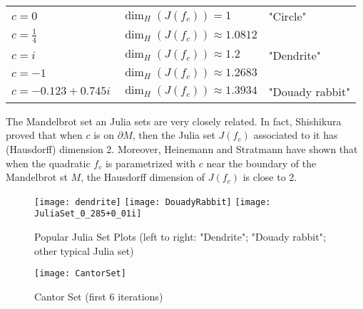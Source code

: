 \vspace{0.2cm}
\begin{tabular}{l l l}\label{table:JuliaSetDimensions}
	$c = 0$             & $\dim_H(J(f_c)) = 1$            & "Circle"\\
	$c = \frac{1}{4}$   & $\dim_H(J(f_c)) \approx 1.0812$ & \\
	$c = i$             & $\dim_H(J(f_c)) \approx 1.2$    & "Dendrite" \\
	$c = -1$            & $\dim_H(J(f_c)) \approx 1.2683$ & \\
	$c = -0.123+0.745i$ & $\dim_H(J(f_c)) \approx 1.3934$ & "Douady rabbit" \\
\end{tabular}
\vspace{0.3cm}

The Mandelbrot set an Julia sets are very closely related.
In fact, Shishikura proved \cite{Shishikura_1992} that when $c$ is on $\partial M$, then the Julia set $J(f_c)$ associated to it has (Hausdorff) dimension 2.
Moreover, Heinemann and Stratmann have shown \cite{Heinemann_Stratmann_1998} that when the quadratic $f_c$ is parametrized with $c$ near the boundary of the Mandelbrot st $M$, the Hausdorff dimension of $J(f_c)$ is close to 2.

\begin{figure}[h]
	\texttt{[image: dendrite]}
	\texttt{[image: DouadyRabbit]}
	\texttt{[image: JuliaSet\_0\_285+0\_01i]}
	\centering
	\captionsetup{justification=centering}
	\caption[Julia sets examples]{Popular Julia Set Plots \newline (left to right: "Dendrite"\footnotemark; "Douady rabbit"\footnotemark; other typical Julia set\footnotemark)}
	\label{fig:JuliaSet}
\end{figure}
\addtocounter{footnote}{-3}



\vspace{-0.5cm}
\begin{wrapfigure}{r}{5cm}
	\texttt{[image: CantorSet]}
	\centering
	\captionsetup{justification=centering}
	\caption{Cantor Set (first 6 iterations)}
	\label{fig:CantorSet}
	\vspace{-1.5cm}
\end{wrapfigure}
